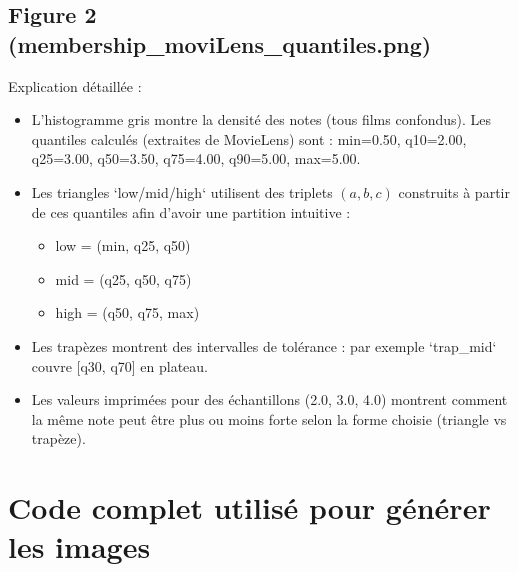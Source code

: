 \documentclass[a4paper,11pt]{article}
\begin{document}
\subsection{Figure 2 (membership\_moviLens\_quantiles.png)}
Explication détaillée :
\begin{itemize}
  \item L'histogramme gris montre la densité des notes (tous films confondus). Les quantiles calculés (extraites de MovieLens) sont : min=0.50, q10=2.00, q25=3.00, q50=3.50, q75=4.00, q90=5.00, max=5.00.
  \item Les triangles `low/mid/high` utilisent des triplets $(a,b,c)$ construits à partir de ces quantiles afin d'avoir une partition intuitive :
    \begin{itemize}
      \item low = (min, q25, q50)
      \item mid = (q25, q50, q75)
      \item high = (q50, q75, max)
    \end{itemize}
  \item Les trapèzes montrent des intervalles de tolérance : par exemple `trap_mid` couvre [q30, q70] en plateau.
  \item Les valeurs imprimées pour des échantillons (2.0, 3.0, 4.0) montrent comment la même note peut être plus ou moins \og forte \fg{} selon la forme choisie (triangle vs trapèze).
\end{itemize}

\section{Code complet utilisé pour générer les images}
\end{document}
